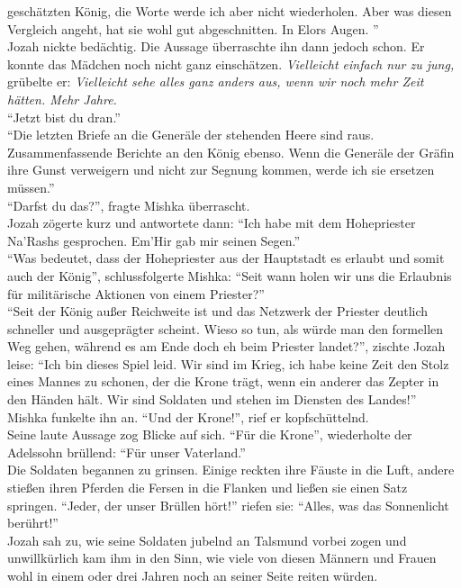 geschätzten König, die Worte werde ich aber nicht wiederholen. Aber was diesen Vergleich angeht, 
hat sie wohl gut abgeschnitten. In Elors Augen. ''\\
Jozah nickte bedächtig. Die Aussage überraschte ihn dann jedoch schon. Er konnte das Mädchen noch 
nicht ganz einschätzen. \textit{Vielleicht einfach nur zu jung,} grübelte er: \textit{Vielleicht 
sehe alles ganz anders aus, wenn wir noch mehr Zeit hätten. Mehr Jahre.}\\
``Jetzt bist du dran.''\\
``Die letzten Briefe an die Generäle der stehenden Heere sind raus. Zusammenfassende Berichte an 
den König ebenso. Wenn die Generäle der Gräfin ihre Gunst verweigern und nicht zur Segnung kommen, 
werde ich sie ersetzen müssen.''\\
``Darfst du das?'', fragte Mishka überrascht.\\
Jozah zögerte kurz und antwortete dann: ``Ich habe mit dem Hohepriester Na'Rashs gesprochen. Em'Hir 
gab mir seinen Segen.''\\
``Was bedeutet, dass der Hohepriester aus der Hauptstadt es erlaubt und somit auch der König'', 
schlussfolgerte Mishka: ``Seit wann holen wir uns die Erlaubnis für militärische Aktionen von einem 
Priester?''\\
``Seit der König außer Reichweite ist und das Netzwerk der Priester deutlich schneller und 
ausgeprägter scheint. Wieso so tun, als würde man den formellen Weg gehen, während es am Ende doch 
eh beim Priester landet?'', zischte Jozah leise: ``Ich bin dieses Spiel leid. Wir sind im Krieg, 
ich habe keine Zeit den Stolz eines Mannes zu schonen, der die Krone trägt, wenn ein anderer das 
Zepter in den Händen hält. Wir sind Soldaten und stehen im Diensten des Landes!''\\
Mishka funkelte ihn an. ``Und der Krone!'', rief er kopfschüttelnd.\\
Seine laute Aussage zog Blicke auf sich. ``Für die Krone'', wiederholte der Adelssohn brüllend: 
``Für unser Vaterland.''\\
Die Soldaten begannen zu grinsen. Einige reckten ihre Fäuste in die Luft, andere stießen ihren 
Pferden die Fersen in die Flanken und ließen sie einen Satz springen. ``Jeder, der unser Brüllen 
hört!'' riefen sie: ``Alles, was das Sonnenlicht berührt!''\\
Jozah sah zu, wie seine Soldaten jubelnd an Talsmund vorbei zogen und unwillkürlich kam ihm in den 
Sinn, wie viele von diesen Männern und Frauen wohl in einem oder drei Jahren noch an seiner Seite 
reiten würden.\\

